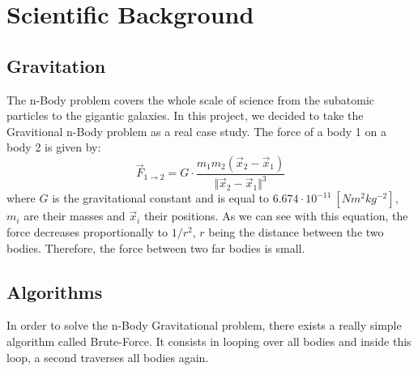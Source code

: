 \documentclass[10pt,a4paper]{article}
\begin{document}



\section{Scientific Background}

\subsection{Gravitation} 

The n-Body problem covers the whole scale of science from the subatomic particles to the gigantic galaxies. In this project, we decided to take the Gravitional n-Body problem as a real case study. The force\cite{grav} of a body 1 on a body 2 is given by:
\begin{equation}
\vec{F}_{1\rightarrow 2} = G\cdot\frac{m_1m_2(\vec{x}_2-\vec{x}_1)}{\Vert \vec{x}_2-\vec{x}_1\Vert^3}
\end{equation}
where $G$ is the gravitational constant and is equal to $6.674 \cdot 10^{-11}~[Nm^2kg^{-2}]$, $m_i$ are their masses and $\vec{x}_i$ their positions. As we can see with this equation, the force decreases proportionally to $1/r^2$, $r$ being the distance between the two bodies. Therefore, the force between two far bodies is small.

\subsection{Algorithms}

In order to solve the n-Body Gravitational problem, there exists a really simple algorithm called Brute-Force. It consists in looping over all bodies and inside this loop, a second traverses all bodies again.
\end{document}
